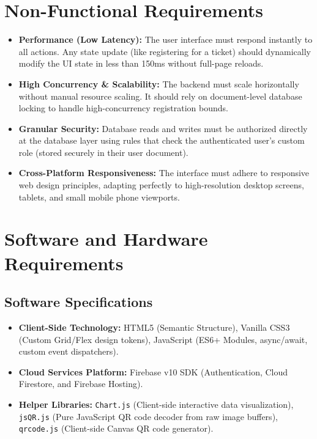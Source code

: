 \documentclass[14pt,a4paper]{extreport}
\begin{document}
\section{Non-Functional Requirements}
\begin{itemize}
    \item \textbf{Performance (Low Latency):} The user interface must respond instantly to all actions. Any state update (like registering for a ticket) should dynamically modify the UI state in less than 150ms without full-page reloads.
    \item \textbf{High Concurrency \& Scalability:} The backend must scale horizontally without manual resource scaling. It should rely on document-level database locking to handle high-concurrency registration bounds.
    \item \textbf{Granular Security:} Database reads and writes must be authorized directly at the database layer using rules that check the authenticated user's custom role (stored securely in their user document).
    \item \textbf{Cross-Platform Responsiveness:} The interface must adhere to responsive web design principles, adapting perfectly to high-resolution desktop screens, tablets, and small mobile phone viewports.
\end{itemize}

\section{Software and Hardware Requirements}
\subsection{Software Specifications}
\begin{itemize}
    \item \textbf{Client-Side Technology:} HTML5 (Semantic Structure), Vanilla CSS3 (Custom Grid/Flex design tokens), JavaScript (ES6+ Modules, async/await, custom event dispatchers).
    \item \textbf{Cloud Services Platform:} Firebase v10 SDK (Authentication, Cloud Firestore, and Firebase Hosting).
    \item \textbf{Helper Libraries:} \texttt{Chart.js} (Client-side interactive data visualization), \texttt{jsQR.js} (Pure JavaScript QR code decoder from raw image buffers), \texttt{qrcode.js} (Client-side Canvas QR code generator).
\end{itemize}
\end{document}
